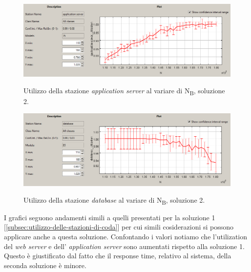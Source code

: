 \documentclass[../main.tex]{subfiles}
\begin{document}
    \begin{figure}[H]
        \centering
        \includegraphics[scale = 0.6]{assets/as_ut_2.PNG}\\
        \caption[\textit{Utilizzo} della stazione \textit{application server}, soluzione 2]{Utilizzo della stazione
        \textit{application server} al variare di N\textsubscript{B}, soluzione 2.}
        \label{fig:utilizzo-2-as}
    \end{figure}

    \begin{figure}[H]
        \centering
        \includegraphics[scale = 0.6]{assets/db_ut_2.PNG}\\
        \caption[\textit{Utilizzo} della stazione \textit{database}, soluzione 2]{Utilizzo della stazione
        \textit{database} al variare di N\textsubscript{B}, soluzione 2.}
        \label{fig:utilizzo-2-db}
    \end{figure}

    I grafici seguono andamenti simili a quelli presentati per la soluzione 1 [\ref{subsec:utilizzo-delle-stazioni-di-coda}] per cui simili cosiderazioni si possono
    applicare anche a questa soluzione.
    Confontando i valori notiamo che l'utilization del \textit{web server} e dell' \textit{application server} sono
    aumentati rispetto alla soluzione 1.
    Questo è giustificato dal fatto che il response time, relativo al sistema, della seconda soluzione è minore.
\end{document}
